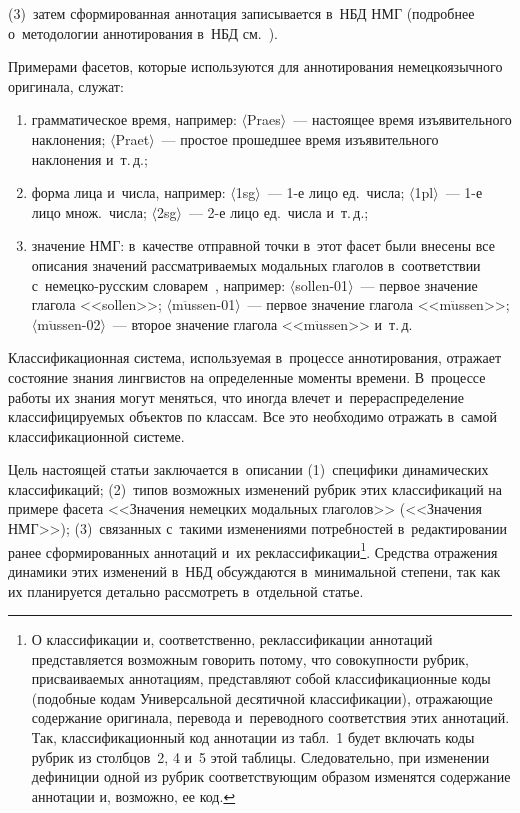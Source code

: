 \begin{multicols}{2}

\noindent
(3)~затем сформированная 
аннотация записывается в~НБД НМГ (подробнее о~методологии 
аннотирования в~НБД см.~\cite{6-gon}).
     
     Примерами фасетов, которые используются для аннотирования 
немецкоязычного оригинала, служат:
     \begin{enumerate}[(1)]
     \item грамматическое время, например: $\langle$Praes$\rangle$~--- 
настоящее время изъявительного наклонения; $\langle$Praet$\rangle$~--- 
простое прошедшее время изъявительного наклонения и~т.\,д.;
\item форма лица и~числа, например: $\langle$1sg$\rangle$~--- 1-е лицо 
ед.\ числа; $\langle$1pl$\rangle$~--- 1-е лицо множ.\ числа; 
$\langle$2sg$\rangle$~--- 2-е лицо ед.\ числа и~т.\,д.;
\item значение НМГ: в~качестве отправной точки в~этот фасет были 
внесены все описания значений рассматриваемых модальных глаголов 
в~соответствии  
с~не\-мец\-ко-рус\-ским словарем~\cite{13-gon}, например:  
$\langle$sollen-01$\rangle$~--- первое значение глагола <<sollen>>; 
$\langle$m$\ddot{\mbox{u}}$ssen-01$\rangle$~--- первое значение 
глагола <<m$\ddot{\mbox{u}}$ssen>>;  
$\langle$m$\ddot{\mbox{u}}$ssen-02$\rangle$~--- второе значение 
глагола <<m$\ddot{\mbox{u}}$ssen>> и~т.\,д.
\end{enumerate}

Классификационная система, используемая в~процессе аннотирования, 
отражает состояние знания лингвистов на определенные моменты времени. 
В~процессе работы их знания могут меняться, что иногда влечет 
и~перераспределение классифицируемых объектов по классам. Все это 
необходимо отражать в~самой классификационной системе.

Цель настоящей статьи заключается в~описании (1)~специфики динамических 
классификаций; (2)~типов возможных изменений рубрик этих классификаций 
на примере фасета <<Значения немецких модальных глаголов>> (<<Значения 
НМГ>>); (3)~связанных с~такими изменениями потребностей 
в~редактировании ранее сформированных аннотаций и~их 
реклассификации\footnote{О классификации и, соответственно, реклассификации 
аннотаций представляется возможным говорить потому, что совокупности рубрик, 
присваиваемых аннотациям, представляют собой классификационные коды (подобные кодам 
Универсальной десятичной классификации), отражающие содержание оригинала, перевода и~переводного соответствия этих 
аннотаций. Так, классификационный код аннотации из табл.~1 будет включать коды рубрик 
из столбцов~2, 4 и~5 этой таблицы. Следовательно, при изменении дефиниции одной из 
рубрик соответствующим образом изменятся содержание аннотации и, возможно, ее код.}. 
Средства отражения динамики этих изменений в~НБД обсуждаются 
в~минимальной степени, так как их планируется детально рассмотреть 
в~отдельной статье.


\end{multicols}
